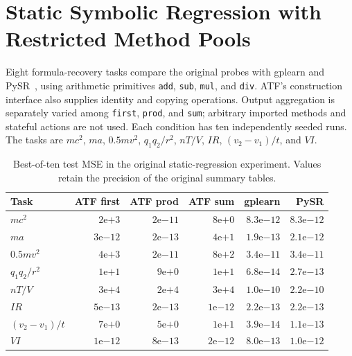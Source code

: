\section{Static Symbolic Regression with Restricted Method Pools}
\label{sec:appendix_baseline_comparison}
Eight formula-recovery tasks compare the original probes with gplearn and
PySR~\cite{cranmer2023interpretable}, using arithmetic primitives
\texttt{add}, \texttt{sub}, \texttt{mul}, and \texttt{div}. ATF's construction
interface also supplies identity and copying operations. Output aggregation
is separately varied among \texttt{first}, \texttt{prod}, and \texttt{sum};
arbitrary imported methods and stateful actions are not used. Each condition
has ten independently seeded runs. The tasks are $mc^2$, $ma$, $0.5mv^2$,
$q_1q_2/r^2$, $nT/V$, $IR$, $(v_2-v_1)/t$, and $VI$.

\begin{table}[tb]
\centering\small
\caption{Best-of-ten test MSE in the original static-regression experiment.
Values retain the precision of the original summary tables.}
\label{tab:compact_regression_mse}
\begin{tabular}{lrrrrr}
\toprule
Task & ATF first & ATF prod & ATF sum & gplearn & PySR \\
\midrule
$mc^2$ & $2\mathrm{e}{+3}$ & $2\mathrm{e}{-11}$ & $8\mathrm{e}{+0}$ & $8.3\mathrm{e}{-12}$ & $8.3\mathrm{e}{-12}$ \\
$ma$ & $3\mathrm{e}{-12}$ & $2\mathrm{e}{-13}$ & $4\mathrm{e}{+1}$ & $1.9\mathrm{e}{-13}$ & $2.1\mathrm{e}{-12}$ \\
$0.5mv^2$ & $4\mathrm{e}{+3}$ & $2\mathrm{e}{-11}$ & $8\mathrm{e}{+2}$ & $3.4\mathrm{e}{-11}$ & $3.4\mathrm{e}{-11}$ \\
$q_1q_2/r^2$ & $1\mathrm{e}{+1}$ & $9\mathrm{e}{+0}$ & $1\mathrm{e}{+1}$ & $6.8\mathrm{e}{-14}$ & $2.7\mathrm{e}{-13}$ \\
$nT/V$ & $3\mathrm{e}{+4}$ & $2\mathrm{e}{+4}$ & $3\mathrm{e}{+4}$ & $1.0\mathrm{e}{-10}$ & $2.2\mathrm{e}{-10}$ \\
$IR$ & $5\mathrm{e}{-13}$ & $2\mathrm{e}{-13}$ & $1\mathrm{e}{-12}$ & $2.2\mathrm{e}{-13}$ & $2.2\mathrm{e}{-13}$ \\
$(v_2-v_1)/t$ & $7\mathrm{e}{+0}$ & $5\mathrm{e}{+0}$ & $1\mathrm{e}{+1}$ & $3.9\mathrm{e}{-14}$ & $1.1\mathrm{e}{-13}$ \\
$VI$ & $1\mathrm{e}{-12}$ & $8\mathrm{e}{-13}$ & $2\mathrm{e}{-12}$ & $8.0\mathrm{e}{-13}$ & $1.0\mathrm{e}{-12}$ \\
\bottomrule
\end{tabular}
\end{table}


